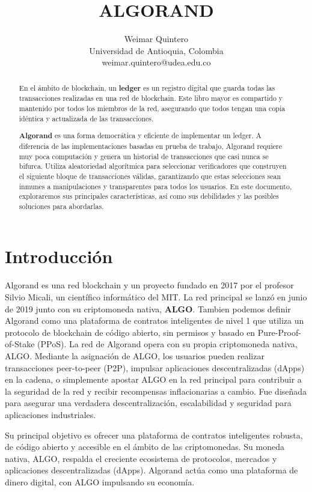 \documentclass{article}
\title{ALGORAND}
\author{Weimar Quintero \\ Universidad de Antioquia, Colombia \\ 
weimar.quintero@udea.edu.co}
\begin{document}
\maketitle

\begin{abstract}
En el ámbito de blockchain, un \textbf{ledger} es un registro digital que guarda todas las transacciones realizadas en una red de blockchain. Este libro mayor es compartido y mantenido por todos los miembros de la red, asegurando que todos tengan una copia idéntica y actualizada de las transacciones.

\textbf{Algorand} es una forma democrática y eficiente de implementar un ledger. A diferencia de las implementaciones basadas en prueba de trabajo, Algorand requiere muy poca computación y genera un historial de transacciones que casi nunca se bifurca. Utiliza aleatoriedad algorítmica para seleccionar verificadores que construyen el siguiente bloque de transacciones válidas, garantizando que estas selecciones sean inmunes a manipulaciones y transparentes para todos los usuarios.
En este documento, exploraremos sus principales características, así como sus debilidades y las posibles soluciones para abordarlas.


\end{abstract}

\section{Introducción}

Algorand es una red blockchain y un proyecto fundado en 2017 por el profesor Silvio Micali, un científico informático del MIT. La red principal se lanzó en junio de 2019 junto con su criptomoneda nativa, \textbf{ALGO}.
Tambien podemos definir Algorand como una plataforma de contratos inteligentes de nivel 1 que utiliza un protocolo de blockchain de código abierto, sin permisos y basado en Pure-Proof-of-Stake (PPoS). La red de Algorand opera con su propia criptomoneda nativa, ALGO. Mediante la asignación de ALGO, los usuarios pueden realizar transacciones peer-to-peer (P2P), impulsar aplicaciones descentralizadas (dApps) en la cadena, o simplemente apostar ALGO en la red principal para contribuir a la seguridad de la red y recibir recompensas inflacionarias a cambio. Fue diseñada para asegurar una verdadera descentralización, escalabilidad y seguridad para aplicaciones industriales.

Su principal objetivo es ofrecer una plataforma de contratos inteligentes robusta, de código abierto y accesible en el ámbito de las criptomonedas. Su moneda nativa, ALGO, respalda el creciente ecosistema de protocolos, mercados y aplicaciones descentralizadas (dApps). Algorand actúa como una plataforma de dinero digital, con ALGO impulsando su economía.
\end{document}
